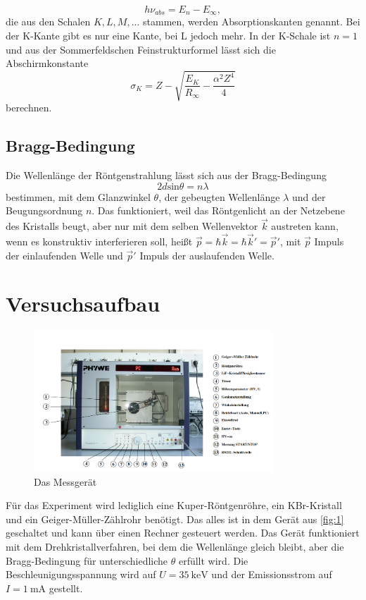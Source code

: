 \begin{equation}
  h\nu_{abs}=E_{n}-E_{\infty},
  \label{5}
\end{equation}
die aus den Schalen $K,L,M,...$ stammen, werden Absorptionskanten genannt. Bei der K-Kante gibt es nur eine Kante, bei L jedoch mehr. In der K-Schale ist $n=1$ und aus der Sommerfeldschen Feinstrukturformel lässt sich die Abschirmkonstante 
\begin{equation}
  \sigma_{K}=Z-\sqrt{\frac{E_{K}}{R_{\infty}}-\frac{\alpha^2 Z^4}{4}}
  \label{eq:6}
\end{equation}
berechnen.\\

\subsection{Bragg-Bedingung}
Die Wellenlänge der Röntgenstrahlung lässt sich aus der Bragg-Bedingung
\begin{equation}
  2d\textrm{sin}\theta=n\lambda
  \label{7}
\end{equation}
bestimmen, mit dem Glanzwinkel $\theta$, der gebeugten Wellenlänge $\lambda$ und der Beugungsordnung $n$. Das funktioniert, weil das Röntgenlicht an der Netzebene des Kristalls beugt, aber nur mit dem selben Wellenvektor $\vec k$ austreten kann, wenn es konstruktiv interferieren soll, heißt $\vec p=\hbar\vec k=\hbar\vec k'=\vec p'$, mit $\vec p$ Impuls der einlaufenden Welle und $\vec p'$ Impuls der auslaufenden Welle. 

\section{Versuchsaufbau}
\begin{figure}[H]
\centering
  \includegraphics[width=9cm]{content/1.png}
  \caption{Das Messgerät}
  \label{fig:1}
\end{figure}
Für das Experiment wird lediglich eine Kuper-Röntgenröhre, ein KBr-Kristall und ein Geiger-Müller-Zählrohr benötigt. Das alles ist in dem Gerät aus \autoref{fig:1} geschaltet und kann über einen Rechner gesteuert werden. Das Gerät funktioniert mit dem Drehkristallverfahren, bei dem die Wellenlänge gleich bleibt, aber die Bragg-Bedingung für unterschiedliche $\theta$ erfüllt wird. Die Beschleunigungsspannung wird auf $U=35\ \si{\keV}$ und der Emissionsstrom auf $I=1\ \si{\mA}$ gestellt.

